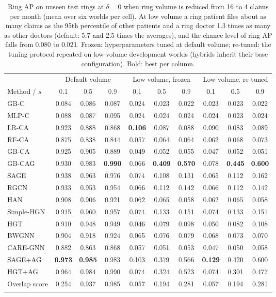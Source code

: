 \documentclass[pdflatex,sn-vancouver-num]{sn-jnl}
\begin{document}
\begin{table}[h]
\caption{Ring AP on unseen test rings at $\delta=0$ when ring volume is reduced from 16 to 4 claims per month (mean over six worlds per cell). At low volume a ring patient files about as many claims as the 95th percentile of other patients and a ring doctor 1.3 times as many as other doctors (default: 5.7 and 2.5 times the averages), and the chance level of ring AP falls from 0.080 to 0.021. Frozen: hyperparameters tuned at default volume; re-tuned: the tuning protocol repeated on low-volume development worlds (hybrids inherit their base configuration). Bold: best per column.}\label{tab:lowvolume}
\scriptsize
\setlength{\tabcolsep}{3.5pt}
\begin{tabular}{@{}lccccccccc@{}}
\toprule
 & \multicolumn{3}{c}{Default volume} & \multicolumn{3}{c}{Low volume, frozen} & \multicolumn{3}{c}{Low volume, re-tuned} \\
\cmidrule(lr){2-4}\cmidrule(lr){5-7}\cmidrule(lr){8-10}
Method / $s$ & 0.1 & 0.5 & 0.9 & 0.1 & 0.5 & 0.9 & 0.1 & 0.5 & 0.9 \\
\midrule
GB-C & 0.084 & 0.086 & 0.087 & 0.024 & 0.023 & 0.022 & 0.023 & 0.023 & 0.022 \\
MLP-C & 0.088 & 0.087 & 0.095 & 0.024 & 0.024 & 0.024 & 0.024 & 0.023 & 0.024 \\
LR-CA & 0.923 & 0.888 & 0.868 & \textbf{0.106} & 0.087 & 0.088 & 0.090 & 0.083 & 0.089 \\
RF-CA & 0.875 & 0.838 & 0.844 & 0.057 & 0.064 & 0.064 & 0.062 & 0.068 & 0.073 \\
GB-CA & 0.925 & 0.905 & 0.889 & 0.049 & 0.052 & 0.055 & 0.047 & 0.052 & 0.051 \\
GB-CAG & 0.930 & 0.983 & \textbf{0.990} & 0.066 & \textbf{0.409} & \textbf{0.570} & 0.078 & \textbf{0.445} & \textbf{0.600} \\
\midrule
SAGE & 0.938 & 0.963 & 0.976 & 0.074 & 0.108 & 0.131 & 0.065 & 0.112 & 0.162 \\
RGCN & 0.933 & 0.953 & 0.954 & 0.066 & 0.112 & 0.142 & 0.066 & 0.112 & 0.142 \\
HAN & 0.908 & 0.906 & 0.921 & 0.062 & 0.065 & 0.058 & 0.062 & 0.065 & 0.058 \\
Simple-HGN & 0.915 & 0.960 & 0.957 & 0.074 & 0.133 & 0.151 & 0.074 & 0.133 & 0.151 \\
HGT & 0.910 & 0.948 & 0.949 & 0.046 & 0.079 & 0.098 & 0.050 & 0.082 & 0.108 \\
\midrule
BWGNN & 0.904 & 0.918 & 0.924 & 0.065 & 0.076 & 0.079 & 0.068 & 0.073 & 0.070 \\
CARE-GNN & 0.882 & 0.863 & 0.868 & 0.057 & 0.051 & 0.053 & 0.047 & 0.050 & 0.058 \\
\midrule
SAGE+AG & \textbf{0.973} & \textbf{0.985} & 0.983 & 0.103 & 0.379 & 0.566 & \textbf{0.129} & 0.420 & 0.600 \\
HGT+AG & 0.964 & 0.984 & 0.990 & 0.074 & 0.324 & 0.523 & 0.074 & 0.301 & 0.477 \\
Overlap score & 0.254 & 0.937 & 0.985 & 0.057 & 0.194 & 0.281 & 0.057 & 0.194 & 0.281 \\
\botrule
\end{tabular}
\end{table}
\end{document}

